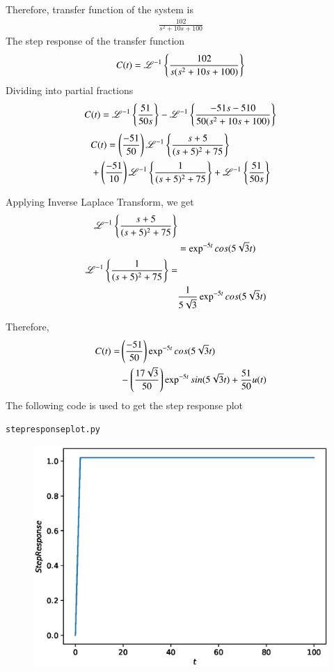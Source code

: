 \begin{enumerate}[label=\thesection.\arabic*.,ref=\thesection.\theenumi]
Therefore, transfer function of the system is
\begin{align}
    \frac{102}{s^2+10s+100}
\end{align}
The step response of the transfer function 
\begin{align}
    C(t)=\mathscr{L}^{-1}\left\{\frac{102}{s(s^2+10s+100)}\right\}
\end{align}
Dividing into partial fractions
\begin{align}
C(t)=\mathscr{L}^{-1}\left\{\frac{51}{50s}\right\}-\mathscr{L}^{-1}\left\{\frac{-51s-510}{50(s^2+10s+100)}\right\}
\end{align}
\begin{align}
&C(t)=\left(\frac{-51}{50}\right)\mathscr{L}^{-1}\left\{\frac{s+5}{(s+5)^2+75}\right\}\nonumber\\
&+\left(\frac{-51}{10}\right)\mathscr{L}^{-1}\left\{\frac{1}{(s+5)^2+75}\right\}+\mathscr{L}^{-1}\left\{\frac{51}{50s}\right\}
\end{align}
\newline

Applying Inverse Laplace Transform, we get
\begin{align}
\mathscr{L}^{-1}\left\{\frac{s+5}{(s+5)^2+75}\right\}\nonumber\\
&=\exp^{-5t}cos(5\sqrt{3}t)
    \\
\mathscr{L}^{-1}\left\{\frac{1}{(s+5)^2+75}\right\}=\nonumber\\&\frac{1}{5\sqrt{3}}\exp^{-5t}cos(5\sqrt{3}t)
\end{align}
\newline

Therefore,
\begin{align}
C(t)=&\left(\frac{-51}{50}\right)\exp^{-5t}cos(5\sqrt{3}t)\nonumber\\
&-\left(\frac{17\sqrt{3}}{50}\right)\exp^{-5t}sin(5\sqrt{3}t)+\frac{51}{50}u(t)
\end{align}
The following code is used to get the step response plot
\begin{lstlisting}
stepresponseplot.py
\end{lstlisting}
\begin{figure}
\centering
\includegraphics[width=\columnwidth]{./plot.eps}
\caption{}
\label{fig:sec_order}
\end{figure}
\end{enumerate}

